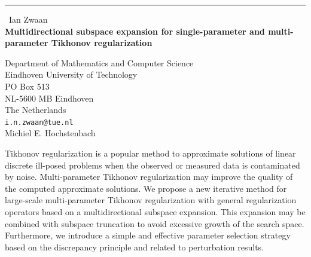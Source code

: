 \documentclass{report}
\begin{document}
\begin{center}
\rule{6in}{1pt} \
{\large Ian Zwaan \\
{\bf Multidirectional subspace expansion for single-parameter and multi-parameter Tikhonov regularization}}

Department of Mathematics and Computer Science \\ Eindhoven University of Technology \\ PO Box 513 \\ NL-5600 MB Eindhoven \\ The Netherlands
\\
{\tt i.n.zwaan@tue.nl}\\
Michiel E. Hochstenbach\end{center}

Tikhonov regularization is a popular method to approximate solutions of
linear discrete ill-posed problems when the observed or measured data is
contaminated by noise. Multi-parameter Tikhonov regularization may
improve the quality of the computed approximate solutions. We propose a
new iterative method for large-scale multi-parameter Tikhonov
regularization with general regularization operators based on a
multidirectional subspace expansion. This expansion may be combined with
subspace truncation to avoid excessive growth of the search space.
Furthermore, we introduce a simple and effective parameter selection
strategy based on the discrepancy principle and related to perturbation
results.
\end{document}
